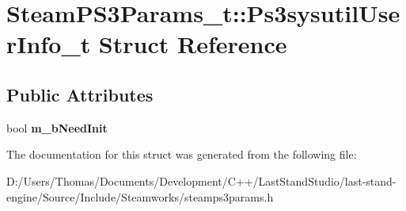 \hypertarget{structSteamPS3Params__t_1_1Ps3sysutilUserInfo__t}{}\section{Steam\+P\+S3\+Params\+\_\+t\+:\+:Ps3sysutil\+User\+Info\+\_\+t Struct Reference}
\label{structSteamPS3Params__t_1_1Ps3sysutilUserInfo__t}
\subsection*{Public Attributes}
\begin{DoxyCompactItemize}
\item 
\hypertarget{structSteamPS3Params__t_1_1Ps3sysutilUserInfo__t_af2be8c152949c103f63f39a3de892a04}{}bool {\bfseries m\+\_\+b\+Need\+Init}\label{structSteamPS3Params__t_1_1Ps3sysutilUserInfo__t_af2be8c152949c103f63f39a3de892a04}

\end{DoxyCompactItemize}


The documentation for this struct was generated from the following file\+:\begin{DoxyCompactItemize}
\item 
D\+:/\+Users/\+Thomas/\+Documents/\+Development/\+C++/\+Last\+Stand\+Studio/last-\/stand-\/engine/\+Source/\+Include/\+Steamworks/steamps3params.\+h\end{DoxyCompactItemize}
